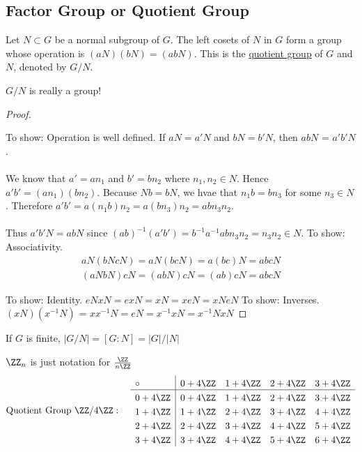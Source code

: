\documentclass[class=scrartcl, crop=false]{standalone}
\begin{document}
\subsection{Factor Group or Quotient Group}
\begin{definition}
  Let $N \subset G$ be a normal subgroup of $G$. The left cosets of $N$ in $G$ form a group whose operation is $(aN)(bN) = (abN)$. 
  This is the \ul{quotient group} of $G$ and $N$, denoted by $G / N$.
\end{definition}
\begin{theorem}
  $G / N$ is really a group!
  \begin{proof}
    \begin{enumerate}
      
      \ii[]
      \ii
    To show: Operation is well defined. If $aN = a'N$ and $bN = b'N$, then $abN$ = $a'b'N$.
    \\\\
    We know that $a' = an_1$ and $b' = bn_2$ where $n_1,n_2 \in N$. Hence $a'b' = (an_1)(bn_2)$. Because $Nb = bN$, we hvae that $n_1b = bn_3$ for some $n_3 \in N$. Therefore $a'b' = a(n_1b)n_2 = a(bn_3)n_2 = abn_3n_2$.
    \\\\
    Thus $a'b'N = abN$ since $(ab)^{-1}(a'b') = b^{-1}a^{-1}abn_3n_2 = n_3n_2 \in N$.
    \ii
    To show: Associativity.
    \begin{gather*}
      aN(bNcN) = aN(bcN) = a(bc)N = abcN \\
      (aNbN)cN = (abN)cN = (ab)cN = abcN
    \end{gather*}
    \end{enumerate}
    \ii
    To show: Identity. $eNxN = exN = xN = xeN = xNeN$
    \ii
    To show: Inverses. $(xN)(x^{-1}N)$ = $xx^{-1}N = eN = x^{-1}xN = x^{-1}NxN$
  \end{proof}
\end{theorem}
\begin{recall}
  If $G$ is finite, $|G / N| = [G:N] = |G| / |N|$
\end{recall}
\begin{example}
  $\ZZ_n$ is just notation for $\frac{\ZZ}{n\ZZ}$
   \[
     \text{Quotient Group} \ \ZZ / 4\ZZ: \quad
       \setlength{\extrarowheight}{3pt}%
       \begin{array}{l|*{5}{l}}
       \circ      & 0 + 4\ZZ & 1 + 4\ZZ & 2 + 4\ZZ & 3 + 4\ZZ \\
       \hline
       0 + 4\ZZ           & 0 + 4\ZZ & 1 + 4\ZZ & 2 + 4\ZZ & 3 + 4\ZZ \\
       1 + 4\ZZ           & 1 + 4\ZZ & 2 + 4\ZZ & 3 + 4\ZZ & 4 + 4\ZZ \\
       2 + 4\ZZ           & 2 + 4\ZZ & 3 + 4\ZZ & 4 + 4\ZZ & 5 + 4\ZZ \\
       3 + 4\ZZ           & 3 + 4\ZZ & 4 + 4\ZZ & 5 + 4\ZZ & 6 + 4\ZZ \\
       \end{array}
   \]
\end{example}
\end{document}
